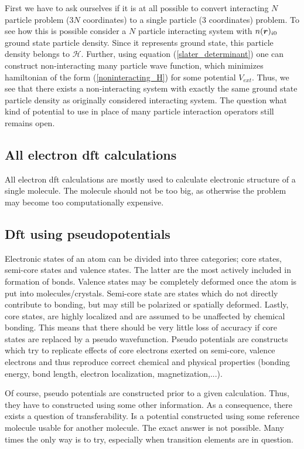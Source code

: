 \message{ !name(document.tex)}\documentclass[openany, longbibliography,slovene,a4paper,12pt]{article}
\def\vec#1{\mbox{\boldmath$#1$}}
\begin{document}
First we have to ask ourselves if it is at all possible to convert interacting
$N$ particle problem ($3N$ coordinates) to a single particle (3 coordinates)
problem. To see how this is possible consider a $N$ particle interacting system
with $n(\vec r)_{i0}$ ground state particle density. Since it represents ground
state,  this particle density belongs to $\mathcal H$. Further, using equation
(\ref{slater_determinant}) one can construct non-interacting many particle wave
function, which minimizes hamiltonian of the form (\ref{noninteracting_H})
for some potential $V_{ext}$. Thus, we see that there exists a non-interacting
system with exactly the same ground state particle density as originally
considered interacting system. The question what kind of potential to use in
place of many particle interaction operators still remains open.  

\subsection{All electron dft calculations}
All electron dft calculations are mostly used to calculate electronic structure of
 a single molecule. The molecule should not be too big, as otherwise the problem
 may become too computationally expensive. 

\subsection{Dft using pseudopotentials}
Electronic states of an atom can be divided into three categories; core states,
semi-core states and valence states. The latter are the most actively included
in formation of bonds. Valence states may be completely deformed once the atom
is put into molecules/crystals. Semi-core state are states which do not
directly contribute to bonding, but may still be polarized or spatially
deformed. Lastly, core states, are highly localized and are assumed to be
unaffected by chemical bonding. This means that there should be very little loss
of accuracy if core states are replaced by a pseudo wavefunction.
Pseudo potentials are constructs which try to
replicate effects of core electrons exerted on semi-core, valence electrons and
thus reproduce correct chemical and physical properties (bonding energy, bond
length, electron localization, magnetization,...).

Of course, pseudo potentials are constructed prior to a given calculation. Thus,
they have to constructed using some other information. As a consequence, there
exists a question of transferability. Is a potential constructed using some
reference molecule usable for another molecule. The exact answer is
not possible. Many times the only way is to try, especially when transition
elements are in question.
\end{document}
